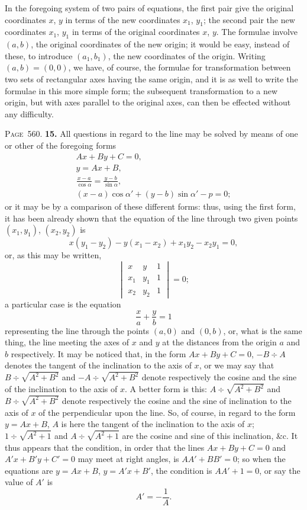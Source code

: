 \documentclass[11pt,a4paper]{book}
\begin{document}
In the foregoing system of two pairs of equations, the first pair give the original coordinates $x$, $y$ in terms of the new coordinates $x_1$, $y_1$; the second pair the new coordinates $x_1$, $y_1$ in terms of the original coordinates $x$, $y$. The formulae involve $(a,b)$, the original coordinates of the new origin; it would be easy, instead of these, to introduce $(a_1,b_1)$, the new coordinates of the origin. Writing $(a,b)=(0,0)$, we have, of course, the formulae for transformation between two sets of rectangular axes having the same origin, and it is as well to write the formulae in this more simple form; the subsequent transformation to a new origin, but with axes parallel to the original axes, can then be effected without any difficulty.

\newpage
\noindent\textsc{Page~560.} \textbf{15.} All questions in regard to the line may be solved by means of one or other of the foregoing forms
\begin{gather*}
Ax+By+C=0,\\
y=Ax+B,\\
\frac{x-a}{\cos\alpha} = \frac{y-b}{\sin\alpha},\\
(x-a)\cos\alpha' + (y-b)\sin\alpha' - p = 0;
\end{gather*}
or it may be by a comparison of these different forms: thus, using the first form, it has been already shown that the equation of the line through two given points $(x_1,y_1)$, $(x_2,y_2)$ is
\[
x(y_1-y_2)-y(x_1-x_2)+x_1y_2-x_2y_1=0,
\]
or, as this may be written,
\[
\begin{vmatrix} x & y & 1 \\ x_1 & y_1 & 1 \\ x_2 & y_2 & 1 \end{vmatrix} = 0;
\]
a particular case is the equation
\[
\frac{x}{a}+\frac{y}{b}=1
\]
representing the line through the points $(a,0)$ and $(0,b)$, or, what is the same thing, the line meeting the axes of $x$ and $y$ at the distances from the origin $a$ and $b$ respectively. It may be noticed that, in the form $Ax+By+C=0$, $-B\div A$ denotes the tangent of the inclination to the axis of $x$, or we may say that $B\div\sqrt{A^2+B^2}$ and $-A\div\sqrt{A^2+B^2}$ denote respectively the cosine and the sine of the inclination to the axis of $x$. A better form is this: $A\div\sqrt{A^2+B^2}$ and $B\div\sqrt{A^2+B^2}$ denote respectively the cosine and the sine of inclination to the axis of $x$ of the perpendicular upon the line. So, of course, in regard to the form $y=Ax+B$, $A$ is here the tangent of the inclination to the axis of $x$; $1\div\sqrt{A^2+1}$ and $A\div\sqrt{A^2+1}$ are the cosine and sine of this inclination, \&c. It thus appears that the condition, in order that the lines $Ax+By+C=0$ and $A'x+B'y+C'=0$ may meet at right angles, is $AA'+BB'=0$; so when the equations are $y=Ax+B$, $y=A'x+B'$, the condition is $AA'+1=0$, or say the value of $A'$ is
\[
A' = -\frac{1}{A}.
\]
\end{document}
